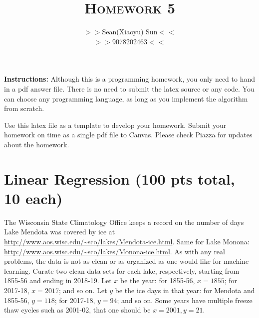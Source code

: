 \documentclass[a4paper]{article}
\title{\textsc{Homework 5}} %
\author{
$>>$Sean(Xiaoyu) Sun$<<$ \\
$>>$9078202463$<<$\\
}
\date{}
\theoremstyle{definition}
\begin{document}
\maketitle 


\textbf{Instructions:} 
Although this is a programming homework, you only need to hand in a pdf answer file.
There is no need to submit the latex source or any code.
You can choose any programming language, as long as you implement the algorithm from scratch. 

Use this latex file as a template to develop your homework.
Submit your homework on time as a single pdf file to Canvas.
Please check Piazza for updates about the homework.



\section*{Linear Regression (100 pts total, 10 each)}

The Wisconsin State Climatology Office keeps a record on
the number of days Lake Mendota was covered by ice at
\url{http://www.aos.wisc.edu/~sco/lakes/Mendota-ice.html}.
Same for Lake Monona:
\url{http://www.aos.wisc.edu/~sco/lakes/Monona-ice.html}.
As with any real problems, the data is not as clean or as organized as one would like for machine learning.
Curate two clean data sets for each lake, respectively, starting from 1855-56 and ending in 2018-19.
Let $x$ be the year: for 1855-56, $x=1855$; for 2017-18, $x=2017$; and so on.
Let $y$ be the ice days in that year: for Mendota and 1855-56, $y=118$; for 2017-18, $y=94$; and so on.
Some years have multiple freeze thaw cycles such as 2001-02, that one should be $x=2001, y=21$.
\end{document}
